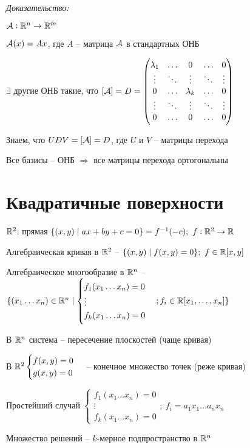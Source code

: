 \documentclass[12pt]{article}
\begin{document}
\textit{Доказательство:}

$\mathcal{A} : \mathbb R^n \to \mathbb R^m$

$\mathcal{A}(x) = Ax$, где $A$ -- матрица $\mathcal{A}$ в стандартных ОНБ

$\exists$ другие ОНБ такие, что $[\mathcal{A}] = D = \begin{pmatrix}
    \lambda_1 & \ldots & 0 & \ldots & 0 \\
    \vdots & \ddots & \vdots & \ddots & \vdots \\
    0 & \ldots & \lambda_k & \ldots & 0 \\
    \vdots & \ddots & \vdots & \ddots & \vdots \\
    0 & \ldots & 0 & \ldots & 0
\end{pmatrix}$

Знаем, что $UDV = [\mathcal{A}] = D$, где $U$ и $V$ -- матрицы перехода 

Все базисы -- ОНБ $\Rightarrow$ все матрицы перехода ортогональны

\section{Квадратичные поверхности}

\begin{nota}{}
    $\mathbb R^2$: прямая $\{(x, y) \mid ax + by + c = 0\} = f^{-1}(-c);\ f : \mathbb R^2 \to \mathbb R$

    Алгебраическая кривая в $\mathbb R^2$ -- $\{(x, y) \mid f(x, y) = 0\};\ f \in \mathbb R[x, y]$

    Алгебраическое многообразие в $\mathbb R^n$ -- $\{(x_1 \ldots x_n) \in \mathbb R^n \mid \begin{cases}
        f_1(x_1 \ldots x_n) = 0 \\
        \vdots \\
        f_k(x_1 \ldots x_n) = 0
    \end{cases}; \\ f_i \in \mathbb R[x_1, \ldots, x_n]\}$

    В $\mathbb R^n$ система -- пересечение плоскостей (чаще кривая)

    В $\mathbb R^2 \begin{cases}
        f(x, y) = 0 \\
        g(x, y) = 0
    \end{cases}$ -- конечное множество точек (реже кривая)
\end{nota}

\begin{Example}{Простейший случай}
    $\begin{cases}
        f_1(x_1 \ldots x_n) = 0 \\
        \vdots \\
        f_k(x_1 \ldots x_n) = 0
    \end{cases};\ f_i = a_1x_1 \ldots a_nx_n$

    Множество решений -- $k$-мерное подпространство в $\mathbb R^n$
\end{Example}
\end{document}

